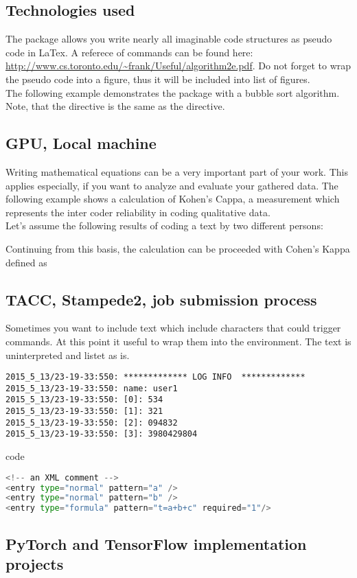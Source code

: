 \subsection{Technologies used}


The package  allows you write nearly all imaginable code structures as pseudo code in LaTex. A referece of commands can be found here: \url{http://www.cs.toronto.edu/~frank/Useful/algorithm2e.pdf}. Do not forget to wrap the pseudo code into a figure, thus it will be included into list of figures.\\

The following example demonstrates the package with a bubble sort algorithm. Note, that the directive  is the same as the  directive.


\newpage
\subsection{GPU, Local machine}

Writing mathematical equations can be a very important part of your work. This applies especially, if you want to analyze and evaluate your gathered data. The following example shows a calculation of Kohen's Cappa, a measurement which represents the inter coder reliability in coding qualitative data.\\

Let's assume the following results of coding a text by two different persons:


Continuing from this basis, the calculation can be proceeded with Cohen's Kappa defined as


\subsection{TACC, Stampede2, job submission process}

Sometimes you want to include text which include characters that could trigger commands. At this point it useful to wrap them into the  environment. The text is uninterpreted and listet as is.

\scriptsize
\begin{verbatim}
2015_5_13/23-19-33:550: ************* LOG INFO  *************
2015_5_13/23-19-33:550: name: user1
2015_5_13/23-19-33:550: [0]: 534
2015_5_13/23-19-33:550: [1]: 321
2015_5_13/23-19-33:550: [2]: 094832
2015_5_13/23-19-33:550: [3]: 3980429804
\end{verbatim}
\normalsize	

code


\small
\begin{lstlisting}[keywordstyle=\color{blue},language=Python]
<!-- an XML comment -->
<entry type="normal" pattern="a" />
<entry type="normal" pattern="b" />
<entry type="formula" pattern="t=a+b+c" required="1"/>
\end{lstlisting}
\normalsize	

\subsection{PyTorch and TensorFlow implementation projects}